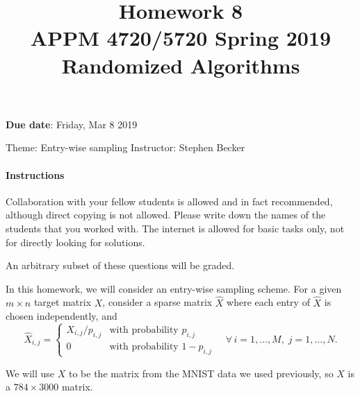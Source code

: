 \documentclass[10pt, letterpaper]{scrartcl}
\title{Homework 8 \solTitle{Selected Solutions} \\APPM 4720/5720 Spring 2019 \\ Randomized Algorithms}
\date{}
\newenvironment{instructions}{}{}
\begin{document}
\maketitle
\vspace{-6em}
\textbf{Due date}: Friday, Mar 8 2019

Theme: Entry-wise sampling   \hfill Instructor: Stephen Becker %

\begin{instructions}
\paragraph{Instructions}
Collaboration with your fellow students is allowed and in fact recommended, although direct copying is not allowed.  Please write down the names of the students that you worked with. The internet is allowed for basic tasks only, not for directly looking for solutions.

An arbitrary subset of these questions will be graded.

%
%
\end{instructions}


\vspace{2ex}
In this homework, we will consider an entry-wise sampling scheme. For a given $m\times n$ target matrix $X$, 
consider a sparse matrix $\hat{X}$ where each entry of $\hat{X}$ is chosen independently, and
\begin{equation} \label{eq:1}
\hat{X}_{i,j} = \begin{cases}  X_{i,j}/p_{i,j} & \text{with probability } p_{i,j} \\
0 & \text{with probability } 1- p_{i,j} \end{cases}
\quad\forall\, i=1,\ldots,M, \; j=1,\ldots,N.
\end{equation}

We will use $X$ to be the matrix from the MNIST data we used previously, so $X$  is a $784\times  3000$ matrix.
\end{document}
